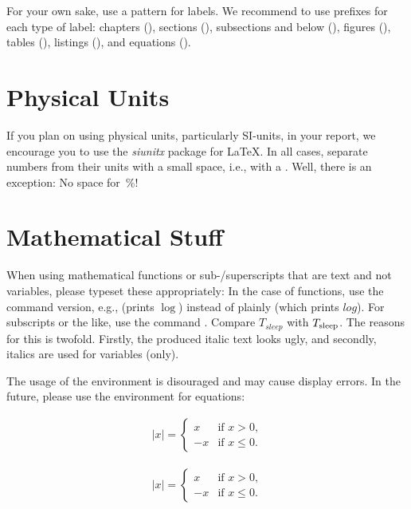 For your own sake, use a pattern for labels. We recommend to use prefixes for each type of label: chapters (), sections (), subsections and below (), figures (), tables (), listings (), and equations ().


\section{Physical Units}\label{sec:siunits}

If you plan on using physical units, particularly SI-units, in your report, we encourage you to use the \emph{siunitx} package for \LaTeX. In all cases, separate numbers from their units with a small space, i.e., with a \cmd{\textbackslash{},}. Well, there is an exception: No space for~\%!


\section{Mathematical Stuff}

When using mathematical functions or sub-/superscripts that are text and not variables, please typeset these appropriately: In the case of functions, use the command version, e.g.,  (prints $\log$) instead of plainly  (which prints $log$). For subscripts or the like, use the command . Compare $T_{sleep}$ with $T_\textnormal{sleep}$. The reasons for this is twofold. Firstly, the produced italic text looks ugly, and secondly, italics are used for variables (only).

The usage of the environment  is disouraged and may cause display errors. In the future, please use the  environment for equations:

\begin{align*}
	|x|= 
	\begin{cases} 
			x 	& \text{if $x > 0 $,} \\
			-x 	& \text{if $x \leq 0$.}
	\end{cases}
\end{align*}

\begin{tuhhlisting}[language=TeX]
\begin{align*}
	|x|= 
	\begin{cases} 
			x 	& \text{if $x > 0 $,} \\
			-x 	& \text{if $x \leq 0$.}
	\end{cases}
\end{align*}
\end{tuhhlisting}



